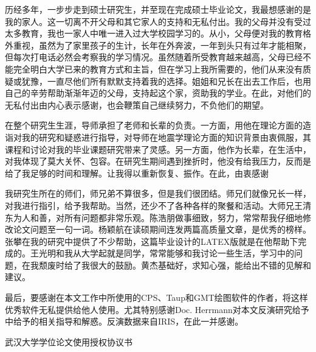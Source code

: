 

\acknowledgement

历经多年，一步步走到硕士研究生，并至现在完成硕士毕业论文，我最想感谢的是我的家人。这一切离不开父母和其它家人的支持和无私付出。我的父母并没有受过太多教育，我也一家人中唯一进入过大学校园学习的。从小，父母便对我的教育格外重视，虽然为了家里孩子的生计，长年在外奔波，一年到头只有过年才能相聚，但每次打电话必然会考察我的学习情况。虽然随着所受教育越来越高，父母已经不能完全明白大学已来的教育方式和主旨，但在学习上我所需要的，他们从来没有质疑或犹豫，一直尽他们所有默默支持着我的选择。姐姐和兄长在出去工作后，也用自己的辛劳帮助渐渐年迈的父母，支持起这个家，资助我的学业。在此，对他们的无私付出由内心表示感谢，也会鞭策自己继续努力，不负他们的期望。

在整个研究生生涯，导师承担了老师和长辈的负责。一方面，用他在理论方面的造诣对我的研究和疑惑进行指导，对导师在地震学理论方面的知识背景由衷佩服，其课程和讨论对我的毕业课题研究带来了灵感。另一方面，他作为长辈，在生活中，对我体现了莫大关怀、包容。在研究生期间遇到挫折时，他没有给我压力，反而是给了我足够的时间和理解。让我得以重新恢复、振作。在此，由衷感谢

我研究生所在的师们，师兄弟不算很多，但是我们很团结。师兄们就像兄长一样，对我进行指引，给予我帮助。当然，还少不了各种各样的聚餐和活动。大师兄王清东为人和善，对所有问题都非常乐观。陈浩朋做事细致，努力，常常帮我仔细地修改论文问题至一句一词。杨颖航在读硕期间连发两篇高质量文章，是优秀的榜样。张攀在我的研究中提供了不少帮助，这篇毕业设计的LATEX版就是在他帮助下完成的。王光明和我从大学起就是同学，常常能够和我讨论一些生活，学习中的问题，在我颓废时给了我很大的鼓励。黄杰基础好，求知心强，能给出不错的见解和建议。

最后，要感谢在本文工作中所使用的CPS、Taup和GMT绘图软件的作者，将这样优秀软件无私提供给他人使用。尤其特别感谢Doc. Herrmann对本文反演研究给予中给予的相关指导和解惑。反演数据来自IRIS，在此一并感谢。




\cleardoublepage
\newpage\vspace*{20pt}
\begin{center}{\heiti 武汉大学学位论文使用授权协议书}\end{center}
\par\vspace*{30pt}

